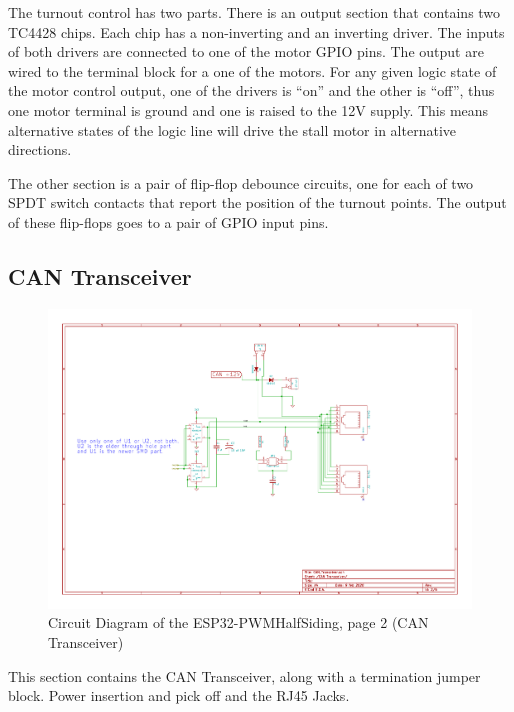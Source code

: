 The turnout control has two parts. There is an output section that contains
two TC4428 chips. Each chip has a non-inverting and an inverting driver. The
inputs of both drivers are connected to one of the motor GPIO pins. The output
are wired to the terminal block for a one of the motors. For any given logic
state of the motor control output, one of the drivers is ``on'' and the other
is ``off'', thus one motor terminal is ground and one is raised to the 12V
supply. This means alternative states of the logic line will drive the stall
motor in alternative directions. 

The other section is a pair of flip-flop debounce circuits, one for each of
two SPDT switch contacts that report the position of the turnout points. The
output of these flip-flops goes to a pair of GPIO input pins.

\clearpage
\subsection{CAN Transceiver}
\begin{figure}[hbpt]\begin{centering}%
\includegraphics[width=5in]{ESP32-PWMHalfSiding-2.pdf}
\caption{Circuit Diagram of the ESP32-PWMHalfSiding, page 2 (CAN Transceiver)}
\end{centering}\end{figure}

This section contains the CAN Transceiver, along with a termination jumper 
block. Power insertion and pick off and the RJ45 Jacks.

\clearpage
